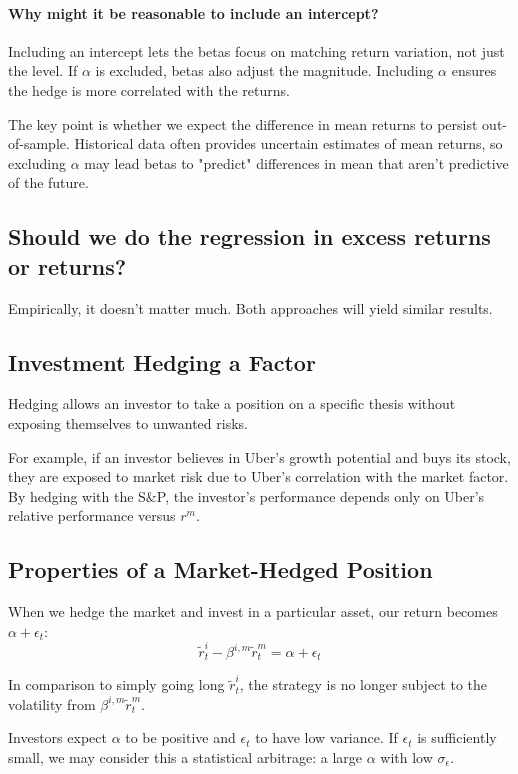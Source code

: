 \documentclass{article}
\begin{document}
\paragraph{Why might it be reasonable to include an intercept?}
Including an intercept lets the betas focus on matching return variation, not just the level. If $\alpha$ is excluded, betas also adjust the magnitude. Including $\alpha$ ensures the hedge is more correlated with the returns.

The key point is whether we expect the difference in mean returns to persist out-of-sample. Historical data often provides uncertain estimates of mean returns, so excluding $\alpha$ may lead betas to "predict" differences in mean that aren't predictive of the future.

\subsection{Should we do the regression in excess returns or returns?}
Empirically, it doesn’t matter much. Both approaches will yield similar results.

\subsection{Investment Hedging a Factor}
Hedging allows an investor to take a position on a specific thesis without exposing themselves to unwanted risks.

For example, if an investor believes in Uber's growth potential and buys its stock, they are exposed to market risk due to Uber's correlation with the market factor. By hedging with the S\&P, the investor's performance depends only on Uber’s relative performance versus $r^m$.

\subsection{Properties of a Market-Hedged Position}
When we hedge the market and invest in a particular asset, our return becomes $\alpha + \epsilon_t$:
$$ \tilde{r}_t^i - \beta^{i,m} \tilde{r}_t^m = \alpha + \epsilon_t $$

In comparison to simply going long $\tilde{r}_t^i$, the strategy is no longer subject to the volatility from $\beta^{i,m} \tilde{r}^m_t$.

Investors expect $\alpha$ to be positive and $\epsilon_t$ to have low variance. If $\epsilon_t$ is sufficiently small, we may consider this a statistical arbitrage: a large $\alpha$ with low $\sigma_\epsilon$.
\end{document}

